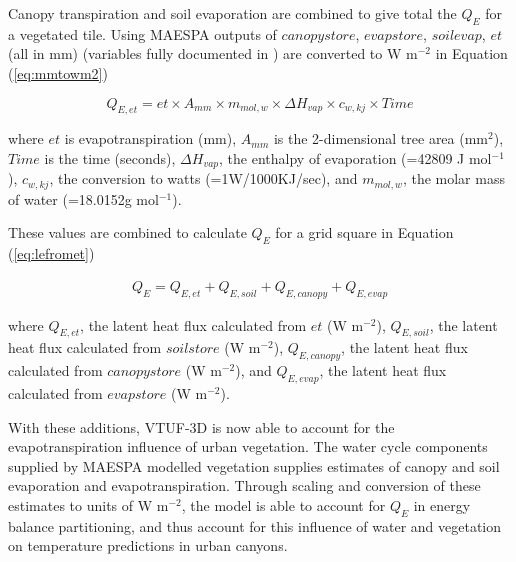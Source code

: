 \documentclass[final,3p,times,authoryear]{elsarticle}
\begin{document}
Canopy transpiration and soil evaporation are combined to give total the $Q_{E}$ for a vegetated tile. Using MAESPA outputs of $canopystore$, $evapstore$, $soilevap$, $et$ (all in mm) (variables fully documented in \cite{Duursma2016}) are converted to W m$^{-2}$ in Equation (\ref{eq:mmtowm2})


\begin{equation}\label{eq:mmtowm2} 
  Q_{E,et} = et \times A _{mm} \times m_{mol,w} \times \Delta H_{vap} \times c_{w,kj} \times Time  
\end{equation} 
 
where $et$ is evapotranspiration (mm), $A _{mm}$ is the 2-dimensional tree area (mm$^{2}$), $Time$ is the time (seconds), $\Delta H_{vap}$, the enthalpy of evaporation (=42809 J mol$^{-1}$), $c_{w,kj}$, the conversion to watts (=1W/1000KJ/sec), and $m_{mol,w}$, the molar mass of water (=18.0152g mol$^{-1}$).

These values are combined to calculate $Q_{E}$ for a grid square in Equation (\ref{eq:lefromet})


\begin{equation}\label{eq:lefromet} 
\begin{aligned}
Q_{E} = Q_{E,et} + Q_{E,soil} + Q_{E,canopy} + Q_{E,evap} 
\end{aligned}
\end{equation}

where $Q_{E,et}$, the latent heat flux calculated from $et$ (W m$^{-2}$), $Q_{E,soil}$, the latent heat flux calculated from $soilstore$ (W m$^{-2}$), $Q_{E,canopy}$, the latent heat flux calculated from $canopystore$ (W m$^{-2}$), and $Q_{E,evap}$, the latent heat flux calculated from $evapstore$ (W m$^{-2}$).




With these additions, VTUF-3D is now able to account for the evapotranspiration influence of urban vegetation. The water cycle components supplied by MAESPA modelled vegetation supplies estimates of canopy and soil evaporation and evapotranspiration. Through scaling and conversion of these estimates to units of W m$^{-2}$, the model is able to account for $Q_{E}$ in energy balance partitioning, and thus account for this influence of water and vegetation on temperature predictions in urban canyons.
\end{document}
